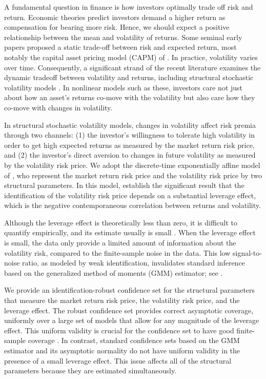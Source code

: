 \documentclass[11pt, letterpaper, twoside]{article}
\begin{document}
A fundamental question in finance is how investors optimally trade off risk and return. Economic theories predict investors demand a higher return as compensation for bearing more risk. Hence, we should expect a positive relationship between the mean and volatility of returns. Some seminal early papers proposed a static trade-off between risk and expected return, most notably the capital asset pricing model (CAPM) of \textcites{sharpe1964capital,lintner1965security}. In practice, volatility varies over time. Consequently, a significant strand of the recent literature examines the dynamic tradeoff between volatility and returns, including structural stochastic volatility models  \parencites{christoffersen2013capturing, bansal2014volatility, dewbecker2017price}.  In nonlinear models such as these, investors care not just about how an asset's returns co-move with the volatility but also care how they co-move with changes in volatility. 

In structural stochastic volatility models, changes in volatility affect risk premia through two channels: (1) the investor's willingness to tolerate high volatility in order to get high expected returns as measured by the market return risk price, and (2) the investor’s direct aversion to changes in future volatility as measured by the volatility risk price. We adopt the discrete-time exponentially affine model of \textcite{han2018leverage}, who represent the market return risk price and the volatility risk price by two structural parameters. In this model,  \textcite{han2018leverage} establish the significant result that the identification of the volatility risk price depends on a substantial leverage effect, which is the negative contemporaneous correlation between returns and volatility. 

Although the leverage effect is theoretically less than zero, it is difficult to quantify empirically, and its estimate usually is small \parencites{aitsahalia2013leverage}. When the leverage effect is small, the data only provide a limited amount of information about the volatility risk, compared to the finite-sample noise in the data. This low signal-to-noise ratio,  as modeled by weak identification, invalidates standard inference based on the generalized method of moments (GMM) estimator; see \textcites{stock2000GMM,andrews2012estimation}.

We provide an identification-robust confidence set for the structural parameters that measure the market return risk price, the volatility risk price, and the leverage effect. 
The robust confidence set provides correct asymptotic coverage, uniformly over a large set of models that allow for any magnitude of the leverage effect. This uniform validity is crucial for the confidence set to have good finite-sample coverage \parencites{mikusheva2007uniform, andrews2010asymptotic}. In contrast, standard confidence sets based on the GMM estimator and its asymptotic normality do not have uniform validity in the presence of a small leverage effect. This issue affects all of the structural parameters because they are estimated simultaneously.
\end{document}
